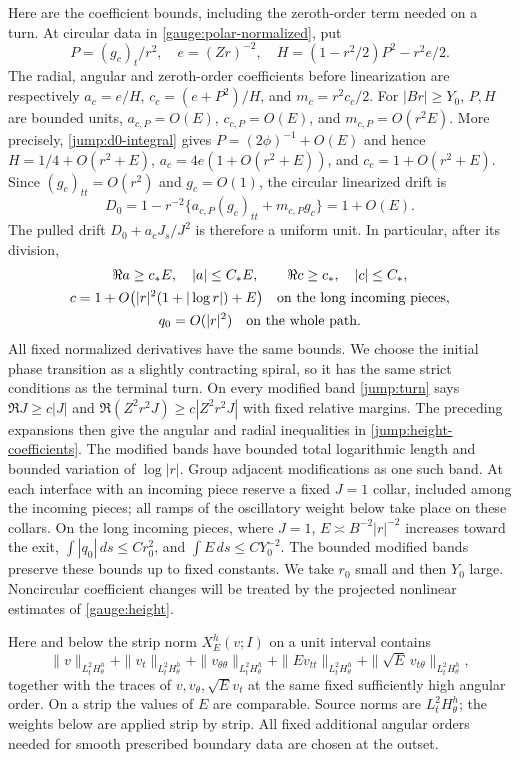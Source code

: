 Here are the coefficient bounds, including the zeroth-order term
needed on a turn.  At circular data in
\eqref{gauge:polar-normalized}, put
\[
 P=(g_c)_t/r^2,\quad e=(Zr)^{-2},\quad
 H=(1-r^2/2)P^2-r^2e/2.
\]
The radial, angular and zeroth-order coefficients before
linearization are respectively
$a_c=e/H$, $c_c=(e+P^2)/H$, and $m_c=r^2c_c/2$.
For $|Br|\geq Y_0$, $P,H$ are bounded units,
$a_{c,P}=O(E)$, $c_{c,P}=O(E)$, and $m_{c,P}=O(r^2E)$.
More precisely, \eqref{jump:d0-integral} gives
$P=(2\phi)^{-1}+O(E)$ and hence
$H=1/4+O(r^2+E)$,
$a_c=4e(1+O(r^2+E))$, and $c_c=1+O(r^2+E)$.
Since $(g_c)_{tt}=O(r^2)$ and $g_c=O(1)$, the circular linearized
drift is
\[
 D_0=1-r^{-2}\{a_{c,P}(g_c)_{tt}+m_{c,P}g_c\}=1+O(E).
\]
The pulled drift $D_0+a_cJ_s/J^2$ is therefore a uniform unit.
In particular, after its division,
\begin{gather}
 \Re a\geq c_*E,\quad |a|\leq C_*E,\qquad
 \Re c\geq c_*,\quad |c|\leq C_*,
 \label{jump:height-coefficients}\\
 c=1+O\bigl(|r|^2(1+|\log r|)+E\bigr)
       \quad\hbox{on the long incoming pieces},\notag\\
 q_0=O(|r|^2)\quad\hbox{on the whole path}.
 \notag
\end{gather}
All fixed normalized derivatives have the same bounds.
We choose the initial phase transition as a slightly contracting
spiral, so it has the same strict conditions as the terminal turn.
On every modified band \eqref{jump:turn} says
$\Re J\geq c|J|$ and
$\Re(Z^2r^2J)\geq c|Z^2r^2J|$ with fixed relative margins.
The preceding expansions then give the
angular and radial inequalities in \eqref{jump:height-coefficients}.
The modified bands have bounded total logarithmic length and
bounded variation of $\log|r|$.  Group adjacent modifications as
one such band.  At each interface with an incoming piece reserve a
fixed $J=1$ collar, included among the incoming pieces; all ramps of
the oscillatory weight below take place on these collars.  On the long incoming pieces,
where $J=1$, $E\asymp B^{-2}|r|^{-2}$
increases toward the exit,
$\int |q_0|\,ds\leq C r_0^2$, and
$\int E\,ds\leq C Y_0^{-2}$.  The bounded modified bands preserve these
bounds up to fixed constants.  We take $r_0$ small and then $Y_0$
large.  Noncircular coefficient changes will be treated by the
projected nonlinear estimates of \cref{gauge:height}.

Here and below the strip norm $X_E^h(v;I)$ on a unit interval contains
\begin{equation}\label{jump:strip-norm}
 \|v\|_{L^2_tH^h_\theta}+\|v_t\|_{L^2_tH^h_\theta}
 +\|v_{\theta\theta}\|_{L^2_tH^h_\theta}
 +\|Ev_{tt}\|_{L^2_tH^h_\theta}
 +\|\sqrt E\,v_{t\theta}\|_{L^2_tH^h_\theta},
\end{equation}
together with the traces of $v,v_\theta,\sqrt E v_t$ at the same
fixed sufficiently high angular order.  On a strip the values of $E$
are comparable.  Source norms are $L^2_tH^h_\theta$; the weights below
are applied strip by strip.  All fixed additional angular orders needed
for smooth prescribed boundary data are chosen at the outset.

